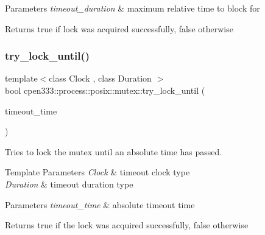 \begin{DoxyParams}{Parameters}
{\em timeout\+\_\+duration} & maximum relative time to block for \\
\hline
\end{DoxyParams}
\begin{DoxyReturn}{Returns}
true if lock was acquired successfully, false otherwise 
\end{DoxyReturn}
\mbox{\label{classcpen333_1_1process_1_1posix_1_1mutex_a0cfd76098d89d269ad4a89115e7673d1}} 
\subsubsection{\texorpdfstring{try\+\_\+lock\+\_\+until()}{try\_lock\_until()}}
{\footnotesize\ttfamily template$<$class Clock , class Duration $>$ \\
bool cpen333\+::process\+::posix\+::mutex\+::try\+\_\+lock\+\_\+until (\begin{DoxyParamCaption}\item[{const std\+::chrono\+::time\+\_\+point$<$ Clock, Duration $>$ \&}]{timeout\+\_\+time }\end{DoxyParamCaption})\hspace{0.3cm}{\ttfamily [inline]}}



Tries to lock the mutex until an absolute time has passed. 


\begin{DoxyTemplParams}{Template Parameters}
{\em Clock} & timeout clock type \\
\hline
{\em Duration} & timeout duration type \\
\hline
\end{DoxyTemplParams}

\begin{DoxyParams}{Parameters}
{\em timeout\+\_\+time} & absolute timeout time \\
\hline
\end{DoxyParams}
\begin{DoxyReturn}{Returns}
true if the lock was acquired successfully, false otherwise 
\end{DoxyReturn}
\mbox{\label{classcpen333_1_1process_1_1posix_1_1mutex_ac1bcf9576d7470e5d64e17876c9cdb36}} 
